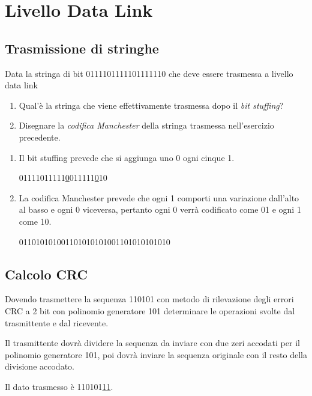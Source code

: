 \section{Livello Data Link}
    \subsection{Trasmissione di stringhe}
        \problem
        Data la stringa di bit 0111101111101111110 che deve essere trasmessa a livello data link
        \begin{enumerate}
            \item Qual'è la stringa che viene effettivamente trasmessa dopo il \textit{bit stuffing}?
            \item Disegnare la \textit{codifica Manchester} della stringa trasmessa nell'esercizio pre\-cedente.
        \end{enumerate}

        \solution
        \begin{enumerate}
            \item Il bit stuffing prevede che si aggiunga uno 0 ogni cinque 1.
            
            \centerline{01111011111\underline{0}011111\underline{0}10}
            \item La codifica Manchester prevede che ogni 1 comporti una variazione dall'al\-to al basso e ogni 0 viceversa, pertanto ogni 0 verrà codificato come 01 e ogni 1 come 10.
            
            \centerline{011010101001101010101001101010101010}
        \end{enumerate}
    
    \subsection{Calcolo CRC}
        \problem
        Dovendo trasmettere la sequenza 110101 con metodo di rilevazione degli errori CRC a 2 bit con polinomio generatore 101 determinare le operazioni svolte dal trasmittente e dal ricevente.

        \solution
        Il trasmittente dovrà dividere la sequenza da inviare con due zeri accodati per il polinomio generatore 101, poi dovrà inviare la sequenza originale con il resto della divisione accodato.

        Il dato trasmesso è 110101\underline{11}.

        

